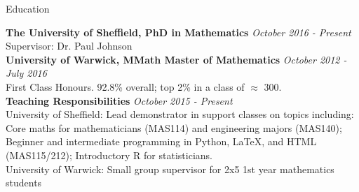 \documentclass{resume} %
\begin{document}

\begin{rSection}{Education}

{\bf The University of Sheffield, PhD in Mathematics} \hfill {\em October 2016 - Present} \\ 
Supervisor: Dr. Paul Johnson \smallskip \\
{\bf University of Warwick, MMath Master of Mathematics} \hfill {\em October 2012 - July 2016} \\
First Class Honours. 92.8\% overall; top 2\% in a class of $\approx$ 300. \medskip \\
{\bf Teaching Responsibilities} \hfill {\em October 2015 - Present} \\
University of Sheffield: Lead demonstrator in support classes on topics including: \\
Core maths for mathematicians (MAS114) and engineering majors (MAS140); Beginner and intermediate programming in Python, LaTeX, and HTML (MAS115/212); Introductory R for statisticians. \\
University of Warwick: Small group supervisor for 2x5 1st year mathematics students

\end{rSection}

\end{document}
